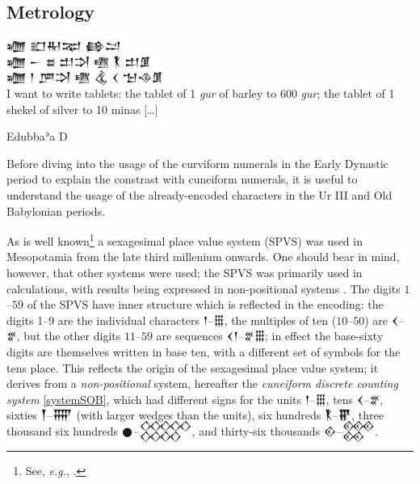 \documentclass[10pt, a4paper, twoside]{article}
\newcommand{\exempligratia}{\emph{e.g.}}
\begin{document}
\subsection{Metrology}
\label{metrology}
\epigraph{{\obfont 𒁾 𒊬𒊑𒉈 𒂵𒁺} \\ {\obfont 𒁾 𒀸 𒊺 𒄥𒋫 𒍠 {\nafont 𒐞} 𒄥𒂠} \\ {\obfont 𒁾 𒁹 𒂆𒋫 𒍠 𒆬 𒌋 𒈠𒈾𒂠} \\
I want to write tablets: the tablet of 1 \emph{gur} of barley to
600 \emph{gur}; the tablet of 1 shekel of silver to 10 minas […]}{Edubbaʾa D}

Before diving into the usage of the curviform numerals
in the Early Dynastic period to explain the constrast
with cuneiform numerals, it is useful to understand
the usage of the already-encoded characters in the
Ur III and Old Babylonian periods.

As is well known\footnote{See, \exempligratia, \cite[Section 22.3.3 ``Non-Decimal Radix Systems'',
\emph{sub} ``\href{https://www.unicode.org/versions/Unicode16.0.0/core-spec/chapter-22/\#G42894}{Cuneiform Numerals}'']{Unicode16}.}
a sexagesimal place value system (SPVS) was used in Meso\-potamia from the late third millenium onwards.
One should bear in mind, however, that other systems were used;
the SPVS was primarily used in calculations,
with results being expressed in non-positional systems \cites[76]{Robson2008}{Robson2022}.
The digits $1$–$59$ of the SPVS have inner structure which is reflected in the encoding: the digits 1–9 are the individual
characters {\xsuxfont 𒁹}–{\xsuxfont 𒑆}, the multiples of ten ($10$–$50$) are {\xsuxfont 𒌋}–{\xsuxfont 𒐐},
but the other digits $11$–$59$ are sequences {\xsuxfont 𒌋𒁹}–{\xsuxfont 𒐐𒑆};
in effect the base-sixty digits are themselves written in base ten, with a different set of symbols for the tens place.
This reflects the origin of the sexagesimal place value system;
it derives from a \emph{non-positional} system, hereafter the \emph{cuneiform discrete counting system} \ref{systemSOB},
which had different signs for the units {\xsuxfont 𒁹}–{\xsuxfont 𒑆},
tens {\xsuxfont 𒌋}–{\xsuxfont 𒐐}, sixties {\xsuxfont 𒐕}–{\xsuxfont 𒐝} (with larger wedges
than the units), six hundreds {\xsuxfont 𒐞}–{\xsuxfont 𒐢},
three thousand six hundreds {\xsuxfont 𒊹}–{\xsuxfont 𒐫}, and thirty-six thousands
 {\xsuxfont 𒐬}–{\xsuxfont 𒐱}.
\end{document}

